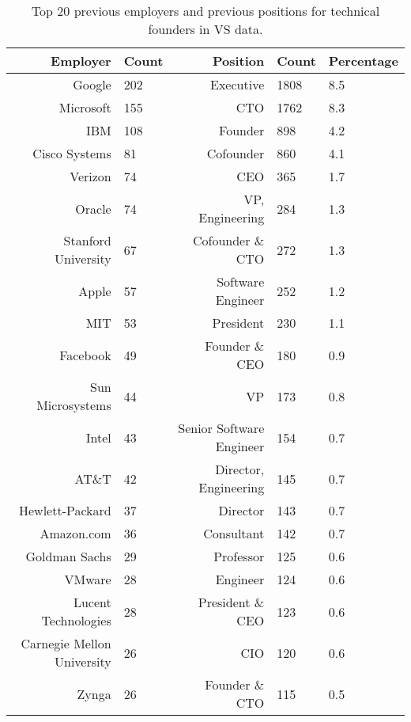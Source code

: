 \begin{table}[!htb]
\centering
\begingroup\footnotesize
\begin{tabular}{rlrll}
  \toprule
Employer & Count & Position & Count & Percentage \\ 
  \midrule
Google & 202 & Executive & 1808 & 8.5 \\ 
  Microsoft & 155 & CTO & 1762 & 8.3 \\ 
  IBM & 108 & Founder & 898 & 4.2 \\ 
  Cisco Systems & 81 & Cofounder & 860 & 4.1 \\ 
  Verizon & 74 & CEO & 365 & 1.7 \\ 
  Oracle & 74 & VP, Engineering & 284 & 1.3 \\ 
  Stanford University & 67 & Cofounder \& CTO & 272 & 1.3 \\ 
  Apple & 57 & Software Engineer & 252 & 1.2 \\ 
  MIT & 53 & President & 230 & 1.1 \\ 
  Facebook & 49 & Founder \& CEO & 180 & 0.9 \\ 
  Sun Microsystems & 44 & VP & 173 & 0.8 \\ 
  Intel & 43 & Senior Software Engineer & 154 & 0.7 \\ 
  AT\&T & 42 & Director, Engineering & 145 & 0.7 \\ 
  Hewlett-Packard & 37 & Director & 143 & 0.7 \\ 
  Amazon.com & 36 & Consultant & 142 & 0.7 \\ 
  Goldman Sachs & 29 & Professor & 125 & 0.6 \\ 
  VMware & 28 & Engineer & 124 & 0.6 \\ 
  Lucent Technologies & 28 & President \& CEO & 123 & 0.6 \\ 
  Carnegie Mellon University & 26 & CIO & 120 & 0.6 \\ 
  Zynga & 26 & Founder \& CTO & 115 & 0.5 \\ 
   \bottomrule
\end{tabular}
\endgroup
\caption{Top 20 previous employers and previous positions for technical founders in VS data.} 
\label{table:VS_previousEmployersSummaryTable}
\end{table}

